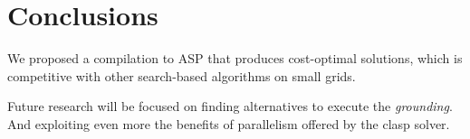 \section{Conclusions}
We proposed a compilation to ASP that produces cost-optimal solutions, which is competitive with other search-based algorithms on small grids.

Future research will be focused on finding alternatives to execute the \emph{grounding}. And exploiting even more the benefits of parallelism offered by the clasp solver.
